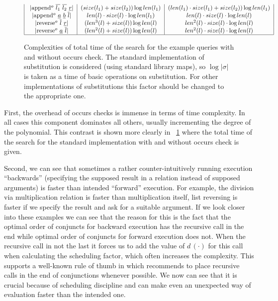 \begin{figure}[t]
\[\begin{tabular}{|c|c|c|}
           \lstinline|append$^o$ $\overline{l_1}$ $\overline{l_2}$ $\underline{r}$| & $(size(l_1) + size(l_2)) \log len(l_1)$ & $(len(l_1) \cdot size(l_1) + size(l_2)) \log len(l_1)$  \\
           \lstinline|append$^o$ $\underline{a}$ $\underline{b}$ $\overline{l}$| & $len(l) \cdot size(l) \cdot  \log len(l_1)$ & $len(l) \cdot size(l) \cdot  \log len(l)$  \\
           \lstinline|reverse$^o$ $\overline{l}$ $\underline{r}$| & $(len^3(l) + size(l)) \log len(l)$ & $len^2(l) \cdot size(l) \cdot \log len(l)$ \\
           \lstinline|reverse$^o$ $\underline{a}$ $\overline{l}$| & $(len^2(l) + size(l)) \log len(l)$ & $len^2(l) \cdot size(l) \cdot \log len(l)$ \\
           \hline
            
      \end{tabular}
    \]
    \caption{Complexities of total time of the search for the example queries with and without occurs check. The standard implementation of substitution is considered (using standard library maps),
      so $\log |\sigma|$ is taken as a time of basic operations on substitution. For other implementations of substitutions this factor should be changed to the appropriate one. }
  \label{fig:examples_total_times}
\end{figure}

First, the overhead of occurs checks is immense in terms of time complexity. In all cases this component dominates all others, usually incrementing the degree of the polynomial.
This contrast is shown more clearly in \figureword~\ref{fig:examples_total_times} where the total time of the search for the standard implementation with and without occurs check is given. 

Second, we can see that sometimes a rather counter-intuitively running execution ``backwards'' (specifying the supposed result in a relation instead of supposed arguments) is faster
than intended ``forward'' execution. For example, the division via multiplication relation is faster than multiplication itself, list reversing is faster if we specify the result and
ask for a suitable argument. If we look closer into these examples we can see that the reason for this is the fact that the optimal order of conjuncts for backward execution has
the recursive call in the end while optimal order of conjuncts for forward execution does not. When the recursive call in not the last it forces us to add the value of $d\,(\cdot)$
for this call when calculating the scheduling factor, which often increases the complexity. This supports a well-known rule of thumb in \mK which recommends to place recursive calls
in the end of conjunctions whenever possible. We now can see that it is crucial because of scheduling discipline and can make even an unexpected way of evaluation faster than
the intended one.

